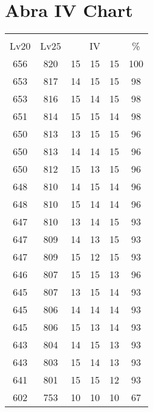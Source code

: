 \documentclass{article}%
\begin{document}
%
\normalsize%
\section{Abra IV Chart}%
\label{sec:Abra IV Chart}%
\renewcommand{\arraystretch}{1.5}%
\begin{tabular}{|c|c|c|c|c|c|}%
\hline%
\multicolumn{6}{|c|}{\textcolor{white}{ 
\linebreak{Abra}
}%
\cellcolor{black}}\\%
\multicolumn{1}{|c}{Lv20}&\multicolumn{1}{c|}{Lv25}&\multicolumn{3}{c|}{IV}&\multicolumn{1}{|c|}{\%}\\%
\hline%
\rowcolor{color100}%
656&820&15&15&15&100\\%
\hline%
\rowcolor{color98}%
653&817&14&15&15&98\\%
\hline%
\rowcolor{color98}%
653&816&15&14&15&98\\%
\hline%
\rowcolor{color98}%
651&814&15&15&14&98\\%
\hline%
\rowcolor{color96}%
650&813&13&15&15&96\\%
\hline%
\rowcolor{color96}%
650&813&14&14&15&96\\%
\hline%
\rowcolor{color96}%
650&812&15&13&15&96\\%
\hline%
\rowcolor{color96}%
648&810&14&15&14&96\\%
\hline%
\rowcolor{color96}%
648&810&15&14&14&96\\%
\hline%
\rowcolor{color93}%
647&810&13&14&15&93\\%
\hline%
\rowcolor{color93}%
647&809&14&13&15&93\\%
\hline%
\rowcolor{color93}%
647&809&15&12&15&93\\%
\hline%
\rowcolor{color96}%
646&807&15&15&13&96\\%
\hline%
\rowcolor{color93}%
645&807&13&15&14&93\\%
\hline%
\rowcolor{color93}%
645&806&14&14&14&93\\%
\hline%
\rowcolor{color93}%
645&806&15&13&14&93\\%
\hline%
\rowcolor{color93}%
643&804&14&15&13&93\\%
\hline%
\rowcolor{color93}%
643&803&15&14&13&93\\%
\hline%
\rowcolor{color93}%
641&801&15&15&12&93\\%
\hline%
\rowcolor{color91}%
602&753&10&10&10&67\\%
\end{tabular}

%
\end{document}
